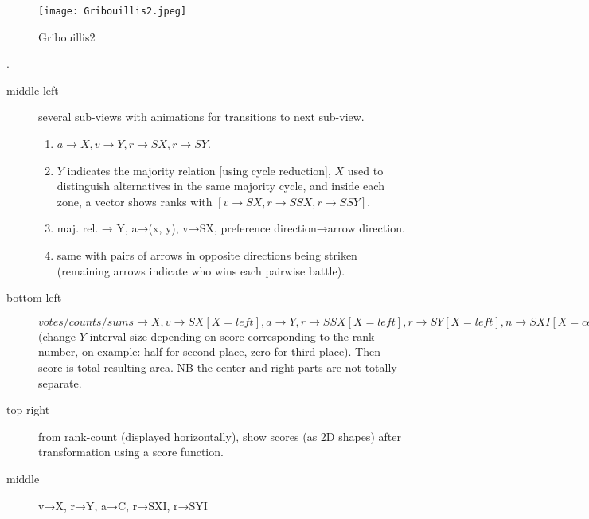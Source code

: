 \documentclass[version=last, pagesize, twoside=off, bibliography=totoc, DIV=calc, fontsize=12pt, a4paper, french, english]{scrartcl}
\begin{document}
\begin{figure}
	\texttt{[image: Gribouillis2.jpeg]}
	\caption{Gribouillis2}
	\label{fig:g2}
\end{figure}
.
\begin{description}
	\item[middle left] several sub-views with animations for transitions to next sub-view.
	\begin{enumerate}
		\item $a→X, v→Y, r→SX, r→SY$.
		\item $Y$ indicates the majority relation [using cycle reduction], $X$ used to distinguish alternatives in the same majority cycle, and inside each zone, a vector shows ranks with $[v→SX, r→SSX, r→SSY]$. 
		\item maj. rel. → Y, a→(x, y), v→SX, preference direction→arrow direction. 
		\item same with pairs of arrows in opposite directions being striken (remaining arrows indicate who wins each pairwise battle).
	\end{enumerate}
	\item[bottom left] $votes/counts/sums→X, v→SX[X=left], a→Y, r→SSX[X=left], r→SY[X=left], n→SXI[X=center], r→SY[X=center], n→SXI[X=right], r→SYI[X=right]$ (change $Y$ interval size depending on score corresponding to the rank number, on example: half for second place, zero for third place). Then score is total resulting area. NB the center and right parts are not totally separate.
	\item[top right] from rank-count (displayed horizontally), show scores (as 2D shapes) after transformation using a score function.
	\item[middle] v→X, r→Y, a→C, r→SXI, r→SYI
\end{description}
\end{document}
